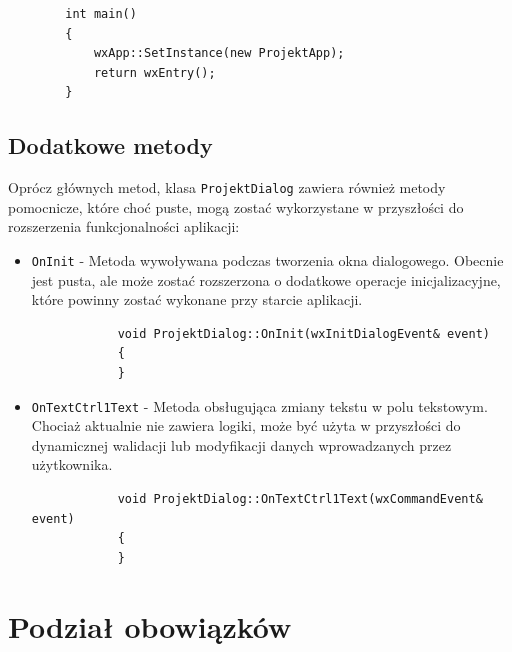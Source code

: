 \documentclass[]{article}
\begin{document}
	\begin{verbatim}
		int main()
		{
			wxApp::SetInstance(new ProjektApp);
			return wxEntry();
		}
	\end{verbatim}
	\subsection{Dodatkowe metody}
	
	Oprócz głównych metod, klasa \texttt{ProjektDialog} zawiera również metody pomocnicze, które choć puste, mogą zostać wykorzystane w przyszłości do rozszerzenia funkcjonalności aplikacji:
	
	\begin{itemize}
		\item \texttt{OnInit} - Metoda wywoływana podczas tworzenia okna dialogowego. Obecnie jest pusta, ale może zostać rozszerzona o dodatkowe operacje inicjalizacyjne, które powinny zostać wykonane przy starcie aplikacji.
		\begin{verbatim}
			void ProjektDialog::OnInit(wxInitDialogEvent& event)
			{
			}
		\end{verbatim}
		\item \texttt{OnTextCtrl1Text} - Metoda obsługująca zmiany tekstu w polu tekstowym. Chociaż aktualnie nie zawiera logiki, może być użyta w przyszłości do dynamicznej walidacji lub modyfikacji danych wprowadzanych przez użytkownika.
		\begin{verbatim}
			void ProjektDialog::OnTextCtrl1Text(wxCommandEvent& event)
			{
			}
		\end{verbatim}
	\end{itemize}
\newpage
\section{Podział obowiązków}
\end{document}
